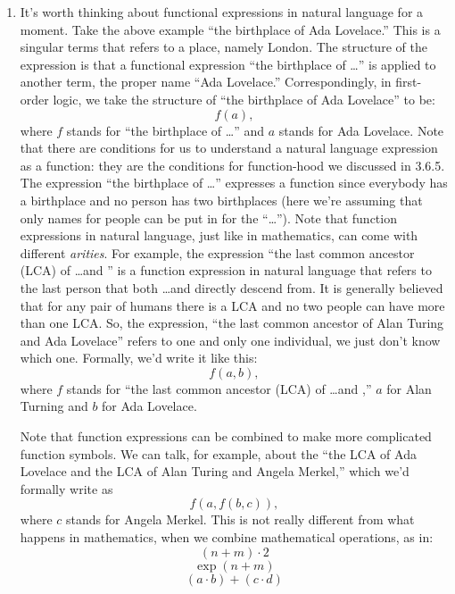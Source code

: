 \begin{enumerate}[\thesection.1]
		\item It's worth thinking about functional expressions in natural language for a moment. Take the above example ``the birthplace of Ada Lovelace.'' This is a singular terms that refers to a place, namely London. The structure of the expression is that a functional expression ``the birthplace of \dots'' is applied to another term, the proper name ``Ada Lovelace.'' Correspondingly, in first-order logic, we take the structure of ``the birthplace of Ada Lovelace'' to be: \[f(a),\] where $f$ stands for ``the birthplace of \dots'' and $a$ stands for Ada Lovelace. Note that there are conditions for us to understand a natural language expression as a function: they are the conditions for function-hood we discussed in 3.6.5. The expression ``the birthplace of \dots'' expresses a function since everybody has a birthplace and no person has two birthplaces (here we're assuming that only names for people can be put in for the ``\dots''). Note that function expressions in natural language, just like in mathematics, can come with different \emph{arities}. For example, the expression ``the last common ancestor (LCA) of \dots and \underline{\phantom{\dots}}'' is a function expression in natural language that refers to the last person that both \dots and \underline{\phantom{\dots}} directly descend from. It is generally believed that for any pair of humans there is a LCA and no two people can have more than one LCA. So, the expression, ``the last common ancestor of Alan Turing and Ada Lovelace'' refers to one and only one individual, we just don't know which one. Formally, we'd write it like this: \[f(a,b),\] where $f$ stands for ``the last common ancestor (LCA) of \dots and \underline{\phantom{\dots}},'' $a$ for Alan Turning and $b$ for Ada Lovelace.
		
		Note that function expressions can be combined to make more complicated function symbols. We can talk, for example, about the ``the LCA of Ada Lovelace and the LCA of Alan Turing and Angela Merkel,'' which we'd formally write as \[f(a,f(b,c)),\] where $c$ stands for Angela Merkel. This is not really different from what happens in mathematics, when we combine mathematical operations, as in: \[(n+m)\cdot 2\]\[\exp(n+m)\]\[(a\cdot b)+(c\cdot d)\]
				

\end{enumerate}
